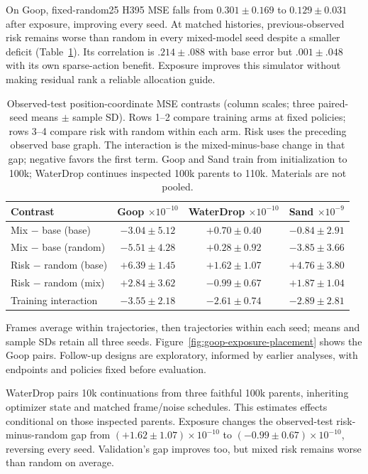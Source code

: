 On Goop, fixed-random25 H395 MSE falls from $0.301\pm0.169$ to $0.129\pm0.031$ after exposure, improving every seed. At matched histories, previous-observed risk remains worse than random in every mixed-model seed despite a smaller deficit (Table~\ref{tab:goop-exposure-placement}). Its correlation is $.214\pm.088$ with base error but $.001\pm.048$ with its own sparse-action benefit. Exposure improves this simulator without making residual rank a reliable allocation guide.

\begin{table}[t]
\centering\scriptsize
\caption{Observed-test position-coordinate MSE contrasts (column scales; three paired-seed means $\pm$ sample SD). Rows 1--2 compare training arms at fixed policies; rows 3--4 compare risk with random within each arm. Risk uses the preceding observed base graph. The interaction is the mixed-minus-base change in that gap; negative favors the first term. Goop and Sand train from initialization to 100k; WaterDrop continues inspected 100k parents to 110k. Materials are not pooled.}
\label{tab:goop-exposure-placement}
\setlength{\tabcolsep}{2pt}
\begin{tabular}{lccc}
\toprule
Contrast & \shortstack{Goop\\$\times10^{-10}$} & \shortstack{WaterDrop\\$\times10^{-10}$} & \shortstack{Sand\\$\times10^{-9}$}\\
\midrule
Mix $-$ base (base) & $-3.04\pm5.12$ & $+0.70\pm0.40$ & $-0.84\pm2.91$\\
Mix $-$ base (random) & $-5.51\pm4.28$ & $+0.28\pm0.92$ & $-3.85\pm3.66$\\
Risk $-$ random (base) & $+6.39\pm1.45$ & $+1.62\pm1.07$ & $+4.76\pm3.80$\\
Risk $-$ random (mix) & $+2.84\pm3.62$ & $-0.99\pm0.67$ & $+1.87\pm1.04$\\
Training interaction & $-3.55\pm2.18$ & $-2.61\pm0.74$ & $-2.89\pm2.81$\\
\bottomrule
\end{tabular}
\end{table}

Frames average within trajectories, then trajectories within each seed; means and sample SDs retain all three seeds. Figure~\ref{fig:goop-exposure-placement} shows the Goop pairs. Follow-up designs are exploratory, informed by earlier analyses, with endpoints and policies fixed before evaluation.

WaterDrop pairs 10k continuations from three faithful 100k parents, inheriting optimizer state and matched frame/noise schedules. This estimates effects conditional on those inspected parents. Exposure changes the observed-test risk-minus-random gap from $(+1.62\pm1.07)\times10^{-10}$ to $(-0.99\pm0.67)\times10^{-10}$, reversing every seed. Validation's gap improves too, but mixed risk remains worse than random on average.

